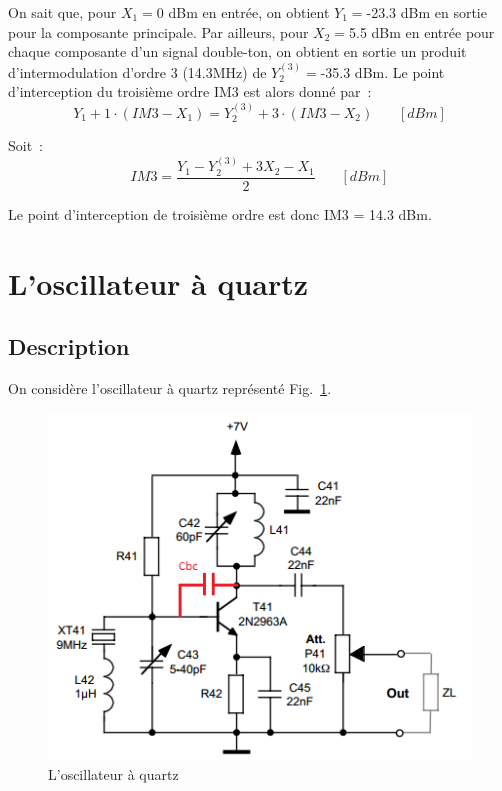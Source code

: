 \documentclass{article}
\begin{document}
On sait que, pour $X_1 = $0 dBm en entrée, on obtient $Y_1 = $-23.3 dBm en sortie pour la composante principale. Par ailleurs, pour $X_2 = $5.5 dBm en entrée pour chaque composante d'un signal double-ton, on obtient en sortie un produit d'intermodulation d'ordre 3 (14.3MHz) de $Y_2^{(3)} = $-35.3 dBm. Le point d'interception du troisième ordre IM3 est alors donné par~:
\begin{equation*}
Y_1 + 1\cdot(IM3-X_1) = Y_2^{(3)}+3\cdot(IM3-X_2)~~~~~~~~[dBm]
\end{equation*}

Soit~: 
\begin{equation*}
IM3=\frac{Y_1 - Y_2^{(3)} + 3 X_2 - X_1}{2}~~~~~~~~[dBm]
\end{equation*}

Le point d'interception de troisième ordre est donc IM3 = 14.3 dBm.







\section{L'oscillateur à quartz}

\subsection{Description}

On considère l'oscillateur à quartz représenté Fig.~\ref{fig:osc_quartz}.

\begin{figure}[h]
	\centering
	\includegraphics[width = 0.7\linewidth]{shema_oscillateur.png}
	\caption{L'oscillateur à quartz}
	\label{fig:osc_quartz}
\end{figure}
\end{document}
